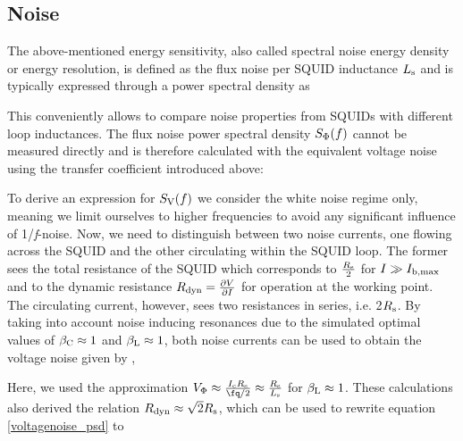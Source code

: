 \subsection{Noise}

The above-mentioned energy sensitivity, also called spectral noise energy density or energy resolution, is defined as the flux noise per SQUID inductance $L_{\rm s}$ and is typically expressed through a power spectral density as 


This conveniently allows to compare noise properties from SQUIDs with different loop inductances. The flux noise power spectral density $S_{\rm \Phi}(f)$ cannot be measured directly and is therefore calculated with the equivalent voltage noise using the transfer coefficient introduced above: 


To derive an expression for $S_{\rm V}(f)$ we consider the white noise regime only, meaning we limit ourselves to higher frequencies to avoid any significant influence of 1/\textit{f}-noise. Now, we need to distinguish between two noise currents, one flowing across the SQUID and the other circulating within the SQUID loop. The former sees the total resistance of the SQUID which corresponds to $\frac{R_{\rm s}}{2}$ for $I\gg I_{\rm b,max}$ and to the dynamic resistance $R_{\rm dyn}=\frac{\partial V}{\partial I}$ for operation at the working point. The circulating current, however, sees two resistances in series, i.e. 2$R_{\rm s}$. By taking into account noise inducing resonances due to the simulated optimal values of $\beta_{\rm C}\approx 1$ and $\beta_{\rm L}\approx 1$, both noise currents can be used to obtain the voltage noise given by \cite{Tesche1977}, \cite{Bruines1982}
 

Here, we used the approximation $V_{\rm \Phi}\approx\frac{I_{\rm c}R_{\rm s}}{\unit{\fq}/2}\approx\frac{R_{\rm s}}{L_{\rm s}}$ for $\beta_{\rm L}\approx 1$. These calculations also derived the relation $R_{\rm dyn}\approx \sqrt{2}R_{\rm s}$, which can be used to rewrite equation \ref{voltagenoise_psd} to 


